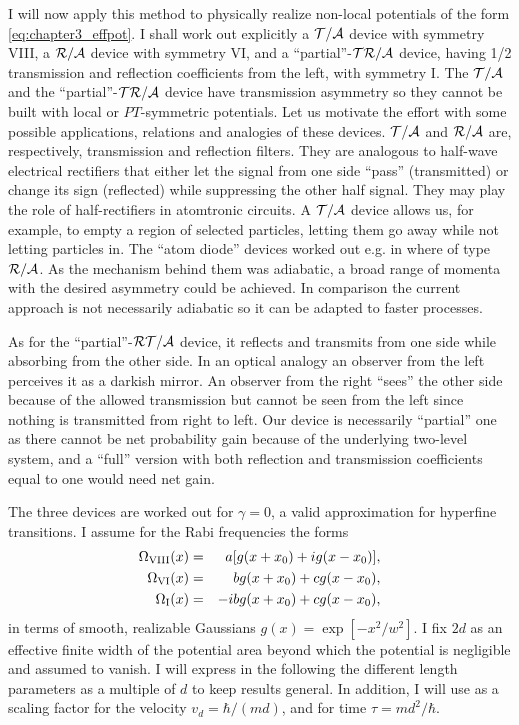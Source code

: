 I will now apply this method to physically realize non-local potentials of the form \eqref{eq:chapter3_effpot}. I shall work out explicitly a ${\cal T/A}$ device with symmetry  VIII, a ${\cal R/A}$ device with symmetry  VI, and a ``partial''-${\cal TR/A}$ device,  having 1/2 transmission and reflection coefficients from the left, with symmetry I. The  ${\cal T/A}$ and the ``partial''-${\cal TR/A}$ device have transmission asymmetry so they cannot be built with local or $PT$-symmetric  potentials.
Let us  motivate the effort with some possible applications, relations  and analogies of these devices.
${\cal T/A}$ and ${\cal R/A}$ are, respectively, transmission and reflection filters. They are analogous to
half-wave electrical rectifiers that either let the signal from one side ``pass'' (transmitted) or change its sign (reflected)
while suppressing the other half signal.  They may play the role of half-rectifiers in atomtronic circuits.
A ${\cal T/A}$ device allows us, for example, to empty a region of selected particles, letting them go away while not letting particles in.
The ``atom diode'' devices worked out e.g. in \cite{Ruschhaupt2004,Ruschhaupt2006a,Ruschhaupt2006,Ruschhaupt2007}
where of type ${\cal R/A}$. As the mechanism behind them was adiabatic, a broad range of momenta with the desired asymmetry
could be achieved. In comparison the current approach is not necessarily adiabatic so it can be adapted to faster processes.

As for the ``partial''-${\cal RT/A}$ device,  it reflects and transmits from one side while absorbing from the
other side. In an optical analogy an observer from the left perceives it as a darkish mirror.
An observer from the right ``sees'' the other side because of the allowed transmission
but cannot be seen from the left since  nothing is transmitted from right to left. Our device is necessarily ``partial'' one as
there cannot be  net probability gain because of the underlying two-level system, and a ``full'' version with both reflection and transmission coefficients equal to one
would need net gain.

The three devices are worked out for $\gamma=0$, a valid approximation for  hyperfine transitions. %
I assume for the Rabi frequencies the forms
%
\begin{eqnarray}
  \Omega_{\rm VIII} (x) &=& a [g(x+x_0) + i  g(x-x_0)],
  \nonumber\\
  \Omega_{\rm VI} (x) &=&  b g(x+x_0) + c g(x-x_0),
  \nonumber\\
  \Omega_{\rm I} (x) &=&  - i b g(x+x_0) + c g(x-x_0),
  \label{3omegas}
\end{eqnarray}
%
in terms of smooth, realizable Gaussians $g(x) =  \exp[-{x^2}/{w^2}]$.
I fix $2 d$ as an effective finite width
of the potential area beyond which the potential is negligible and assumed to vanish. I will express in the following the different length parameters as a multiple of $d$ to keep results general.
In addition, I will use as a scaling factor for the velocity $v_{d} = {\hbar}/({m d})$, and for time $\tau={m d^2}/{\hbar}$.

